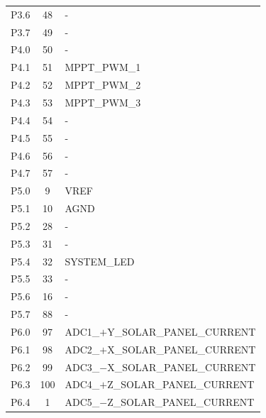\begin{longtable}{lcl}
    P3.6              & 48                  & -                     \\
    P3.7              & 49                  & -                     \\
    \midrule
    P4.0              & 50                  & -                     \\
    P4.1              & 51                  & MPPT\_PWM\_1          \\
    P4.2              & 52                  & MPPT\_PWM\_2          \\
    P4.3              & 53                  & MPPT\_PWM\_3          \\
    P4.4              & 54                  & -                     \\
    P4.5              & 55                  & -                     \\
    P4.6              & 56                  & -                     \\
    P4.7              & 57                  & -                     \\
    \midrule
    P5.0              & 9                   & VREF                  \\
    P5.1              & 10                  & AGND                  \\
    P5.2              & 28                  & -                     \\
    P5.3              & 31                  & -                     \\
    P5.4              & 32                  & SYSTEM\_LED           \\
    P5.5              & 33                  & -                     \\
    P5.6              & 16                  & -                     \\
    P5.7              & 88                  & -                     \\
    \midrule
    P6.0              & 97                  & ADC1\_$+$Y\_SOLAR\_PANEL\_CURRENT \\
    P6.1              & 98                  & ADC2\_$+$X\_SOLAR\_PANEL\_CURRENT \\
    P6.2              & 99                  & ADC3\_$-$X\_SOLAR\_PANEL\_CURRENT \\
    P6.3              & 100                 & ADC4\_$+$Z\_SOLAR\_PANEL\_CURRENT \\
    P6.4              & 1                   & ADC5\_$-$Z\_SOLAR\_PANEL\_CURRENT \\

\end{longtable}
